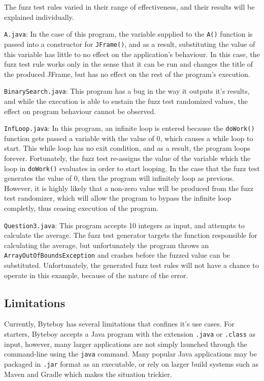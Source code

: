 \documentclass[letterpaper,twocolumn,10pt]{article}
\begin{document}
The fuzz test rules varied in their range of effectiveness, and their results will be explained individually.

{\tt A.java}: In the case of this program, the variable supplied to the {\tt A()} function is passed into a constructor for {\tt JFrame()}, and as a result, substituting the value of this variable has little to no effect on the application's behaviour. In this case, the fuzz test rule works only in the sense that it can be run and changes the title of the produced JFrame, but has no effect on the rest of the program's execution.

{\tt BinarySearch.java}: This program has a bug in the way it outputs it's results, and while the execution is able to sustain the fuzz test randomized values, the effect on program behaviour cannot be observed.

{\tt InfLoop.java}: In this program, an infinite loop is entered because the {\tt doWork()} function gets passed a variable with the value of 0, which causes a while loop to start. This while loop has no exit condition, and as a result, the program loops forever. Fortunately, the fuzz test re-assigns the value of the variable which the loop in {\tt doWork()} evaluates in order to start looping. In the case that the fuzz test generates the value of 0, then the program will infinitely loop as previous. However, it is highly likely that a non-zero value will be produced from the fuzz test randomizer, which will allow the program to bypass the infinite loop completly, thus ceasing execution of the program.

{\tt Question3.java}: This program accepts 10 integers as input, and attempts to calculate the average. The fuzz test generator targets the function responsible for calculating the average, but unfortunately the program throws an {\tt ArrayOutOfBoundsException} and crashes before the fuzzed value can be substituted. Unfortunately, the generated fuzz test rules will not have a chance to operate in this example, because of the nature of the error.

\subsection{Limitations}

Currently, Byteboy has several limitations that confines it's use cases. For starters, Byteboy accepts a Java program with the extension {\tt .java} or {\tt .class} as input, however, many larger applications are not simply launched through the command-line using the {\tt java} command. Many popular Java applications may be packaged in {\tt .jar} format as an executable, or rely on larger build systems such as Maven and Gradle which makes the situation trickier. 
\end{document}
